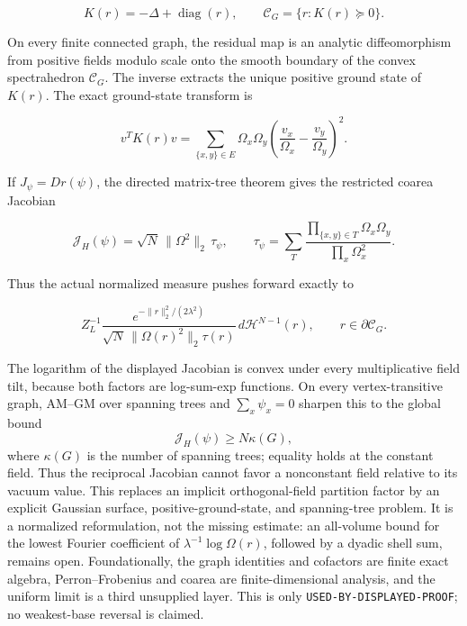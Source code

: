 \documentclass[11pt]{article}
\theoremstyle{definition}
\theoremstyle{remark}
\newcommand{\rtype}[1]{\nolinkurl{#1}}
\begin{document}
\[
 K(r)=-\Delta+\operatorname{diag}(r),\qquad
 \mathcal C_G=\{r:K(r)\succeq0\}.
\]

On every finite connected graph, the residual map is an analytic
diffeomorphism from positive fields modulo scale onto the smooth boundary of
the convex spectrahedron \(\mathcal C_G\).  The inverse extracts the unique
positive ground state of \(K(r)\).  The exact ground-state transform is

\[
 v^TK(r)v=\sum_{\{x,y\}\in E}\Omega_x\Omega_y
 \left(\frac{v_x}{\Omega_x}-\frac{v_y}{\Omega_y}\right)^2.
\]

If \(J_\psi=Dr(\psi)\), the directed matrix-tree theorem gives the
restricted coarea Jacobian

\[
 \mathcal J_H(\psi)=\sqrt N\,\|\Omega^2\|_2\,\tau_\psi,
 \qquad
 \tau_\psi=\sum_T
 \frac{\prod_{\{x,y\}\in T}\Omega_x\Omega_y}
      {\prod_x\Omega_x^2}.
\]

Thus the actual normalized measure pushes forward exactly to

\[
 Z_L^{-1}\frac{e^{-\|r\|_2^2/(2\lambda^2)}}
 {\sqrt N\,\|\Omega(r)^2\|_2\tau(r)}
 \,d\mathcal H^{N-1}(r),
 \qquad r\in\partial\mathcal C_G.
\]

The logarithm of the displayed Jacobian is convex under every multiplicative
field tilt, because both factors are log-sum-exp functions.  On every
vertex-transitive graph, AM--GM over spanning trees and
\(\sum_x\psi_x=0\) sharpen this to the global bound
\[
                   \mathcal J_H(\psi)\geq N\kappa(G),
\]
where \(\kappa(G)\) is the number of spanning trees; equality holds at the
constant field.  Thus the reciprocal Jacobian cannot favor a nonconstant
field relative to its vacuum value.  This replaces an
implicit orthogonal-field partition factor by an explicit Gaussian surface,
positive-ground-state, and spanning-tree problem.  It is a normalized
reformulation, not the missing estimate: an all-volume bound for the lowest
Fourier coefficient of \(\lambda^{-1}\log\Omega(r)\), followed by a dyadic
shell sum, remains open.  Foundationally, the graph identities and cofactors
are finite exact algebra, Perron--Frobenius and coarea are finite-dimensional
analysis, and the uniform limit is a third unsupplied layer.  This is only
\rtype{USED-BY-DISPLAYED-PROOF}; no weakest-base reversal is claimed.
\end{document}
